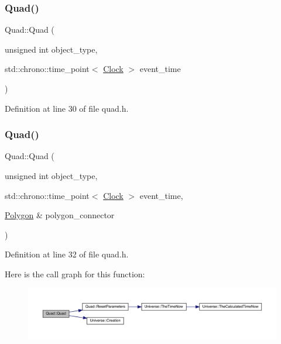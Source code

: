 \subsubsection{\texorpdfstring{Quad()}{Quad()}\hspace{0.1cm}{\footnotesize\ttfamily [3/4]}}
{\footnotesize\ttfamily Quad\+::\+Quad (\begin{DoxyParamCaption}\item[{unsigned int}]{object\+\_\+type,  }\item[{std\+::chrono\+::time\+\_\+point$<$ \hyperlink{universe_8h_a0ef8d951d1ca5ab3cfaf7ab4c7a6fd80}{Clock} $>$}]{event\+\_\+time }\end{DoxyParamCaption})\hspace{0.3cm}{\ttfamily [inline]}}



Definition at line 30 of file quad.\+h.

\mbox{\label{class_quad_a4bb08fd4d953ce61076ed06b51ee2793}} 
\subsubsection{\texorpdfstring{Quad()}{Quad()}\hspace{0.1cm}{\footnotesize\ttfamily [4/4]}}
{\footnotesize\ttfamily Quad\+::\+Quad (\begin{DoxyParamCaption}\item[{unsigned int}]{object\+\_\+type,  }\item[{std\+::chrono\+::time\+\_\+point$<$ \hyperlink{universe_8h_a0ef8d951d1ca5ab3cfaf7ab4c7a6fd80}{Clock} $>$}]{event\+\_\+time,  }\item[{\hyperlink{class_polygon}{Polygon} \&}]{polygon\+\_\+connector }\end{DoxyParamCaption})\hspace{0.3cm}{\ttfamily [inline]}}



Definition at line 32 of file quad.\+h.

Here is the call graph for this function\+:
\nopagebreak
\begin{figure}[H]
\begin{center}
\leavevmode
\includegraphics[width=350pt]{class_quad_a4bb08fd4d953ce61076ed06b51ee2793_cgraph}
\end{center}
\end{figure}
\mbox{\label{class_quad_a64a53d5b7a7811c34a85054828f74866}} 
